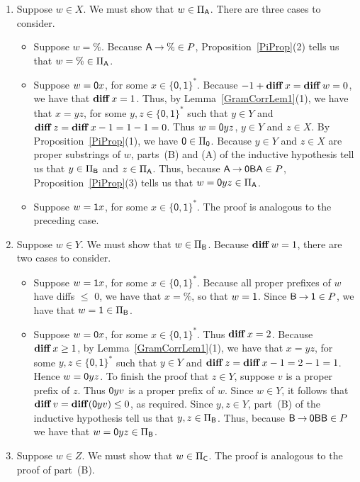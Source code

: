 \begin{enumerate}[\quad(A)]
\item Suppose $w\in X$.  We must show that $w\in\Pi_{\mathsf{A}}$.  There are
  three cases to consider.
  \begin{itemize}
  \item Suppose $w=\%$.  Because $\mathsf{A}\mathbin{\to}\%\in P$,
    Proposition~\ref{PiProp}(2) tells us that $w=\%\in\Pi_{\mathsf{A}}$.
  
  \item Suppose $w=\mathsf{0} x$, for some $x\in\{\mathsf{0,1}\}^*$.
    Because $-1 + \mathbf{diff}\,x = \mathbf{diff}\,w = 0$, we have that $\mathbf{diff}\,x =
    1$.  Thus, by Lemma~\ref{GramCorrLem1}(1), we have that $x=yz$,
    for some $y,z\in\{\mathsf{0,1}\}^*$ such that $y\in Y$ and
    $\mathbf{diff}\,z = \mathbf{diff}\,x - 1 = 1 - 1 = 0$.  Thus $w=\mathsf{0} yz$, $y\in
    Y$ and $z\in X$.  By Proposition~\ref{PiProp}(1), we have
    $\mathsf{0}\in\Pi_{\mathsf{0}}$.  Because $y\in Y$ and $z\in X$ are proper
    substrings of $w$, parts~(B) and (A) of the inductive hypothesis
    tell us that $y\in\Pi_{\mathsf{B}}$ and $z\in\Pi_{\mathsf{A}}$.  Thus, because
    $\mathsf{A}\mathbin{\to}\mathsf{0}\mathsf{B}\mathsf{A}\in P$, Proposition~\ref{PiProp}(3) tells
    us that $w=\mathsf{0} yz\in\Pi_{\mathsf{A}}$.
  
  \item Suppose $w=\mathsf{1} x$, for some $x\in\{\mathsf{0,1}\}^*$.  The
    proof is analogous to the preceding case.
  \end{itemize}

\item Suppose $w\in Y$.  We must show that $w\in\Pi_{\mathsf{B}}$.  Because
  $\mathbf{diff}\,w=1$, there are two cases to consider.
  \begin{itemize}
  \item Suppose $w=\mathsf{1} x$, for some $x\in\{\mathsf{0,1}\}^*$.
    Because all proper prefixes of $w$ have diffs $\leq$ $0$, we
    have that $x=\%$, so that $w=\mathsf{1}$.  Since $\mathsf{B}\mathbin{\to}\mathsf{1}\in P$,
    we have that $w=\mathsf{1}\in\Pi_{\mathsf{B}}$.
  
  \item Suppose $w=\mathsf{0} x$, for some $x\in\{\mathsf{0,1}\}^*$.
    Thus $\mathbf{diff}\,x = 2$.  Because $\mathbf{diff}\,x\geq 1$, by
    Lemma~\ref{GramCorrLem1}(1), we have that $x=yz$, for some
    $y,z\in\{\mathsf{0,1}\}^*$ such that $y\in Y$ and $\mathbf{diff}\,z =
    \mathbf{diff}\,x - 1 = 2 - 1 = 1$.  Hence $w=\mathsf{0} yz$.  To finish the
    proof that $z\in Y$, suppose $v$ is a proper prefix of $z$.
    Thus $\mathsf{0} yv$ is a proper prefix of $w$.  Since $w\in Y$, it
    follows that $\mathbf{diff}\,v = \mathbf{diff}(\mathsf{0} yv)\leq 0$, as required.
    Since $y,z\in Y$, part~(B) of the inductive hypothesis tell us
    that $y,z\in\Pi_{\mathsf{B}}$.  Thus, because $\mathsf{B}\mathbin{\to}\mathsf{0}\mathsf{B}\mathsf{B}\in
    P$ we have that $w=\mathsf{0} yz\in\Pi_{\mathsf{B}}$.
  \end{itemize}

\item Suppose $w\in Z$.  We must show that $w\in\Pi_{\mathsf{C}}$.  The
  proof is analogous to the proof of part~(B).
\end{enumerate}

